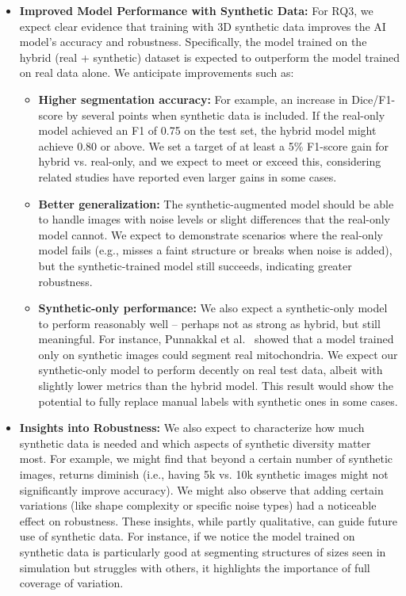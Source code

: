 \documentclass[
oneside,      %
openany       %
]{imc-inf}
\begin{document}
\begin{itemize}
		\item \textbf{Improved Model Performance with Synthetic Data:} For RQ3, we expect clear evidence that training with 3D synthetic data improves the AI model’s accuracy and robustness. Specifically, the model trained on the hybrid (real + synthetic) dataset is expected to outperform the model trained on real data alone. We anticipate improvements such as:
		\begin{itemize}
			\item \textbf{Higher segmentation accuracy:} For example, an increase in Dice/F1-score by several points when synthetic data is included. If the real-only model achieved an F1 of 0.75 on the test set, the hybrid model might achieve 0.80 or above. We set a target of at least a 5\% F1-score gain for hybrid vs. real-only, and we expect to meet or exceed this, considering related studies have reported even larger gains in some cases.
			
			\item \textbf{Better generalization:} The synthetic-augmented model should be able to handle images with noise levels or slight differences that the real-only model cannot. We expect to demonstrate scenarios where the real-only model fails (e.g., misses a faint structure or breaks when noise is added), but the synthetic-trained model still succeeds, indicating greater robustness.
			
			\item \textbf{Synthetic-only performance:} We also expect a synthetic-only model to perform reasonably well – perhaps not as strong as hybrid, but still meaningful. For instance, Punnakkal et al.~\cite{punnakkal2023} showed that a model trained only on synthetic images could segment real mitochondria. We expect our synthetic-only model to perform decently on real test data, albeit with slightly lower metrics than the hybrid model. This result would show the potential to fully replace manual labels with synthetic ones in some cases.
		\end{itemize}
		
		\item \textbf{Insights into Robustness:} We also expect to characterize how much synthetic data is needed and which aspects of synthetic diversity matter most. For example, we might find that beyond a certain number of synthetic images, returns diminish (i.e., having 5k vs. 10k synthetic images might not significantly improve accuracy). We might also observe that adding certain variations (like shape complexity or specific noise types) had a noticeable effect on robustness. These insights, while partly qualitative, can guide future use of synthetic data. For instance, if we notice the model trained on synthetic data is particularly good at segmenting structures of sizes seen in simulation but struggles with others, it highlights the importance of full coverage of variation.
		

\end{itemize}
\end{document}

